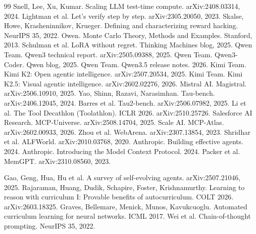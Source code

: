 \documentclass[11pt,a4paper]{article}
\begin{document}
\begin{thebibliography}{99}
 Snell, Lee, Xu, Kumar. Scaling LLM test-time compute. arXiv:2408.03314, 2024.
 Lightman et al. Let's verify step by step. arXiv:2305.20050, 2023.
 Skalse, Howe, Krasheninnikov, Krueger. Defining and characterizing reward hacking. NeurIPS 35, 2022.
 Owen. Monte Carlo Theory, Methods and Examples. Stanford, 2013.
 Schulman et al. LoRA without regret. Thinking Machines blog, 2025.
 Qwen Team. Qwen3 technical report. arXiv:2505.09388, 2025.
 Qwen Team. Qwen3-Coder. Qwen blog, 2025.
 Qwen Team. Qwen3.5 release notes. 2026. %
 Kimi Team. Kimi K2: Open agentic intelligence. arXiv:2507.20534, 2025.
 Kimi Team. Kimi K2.5: Visual agentic intelligence. arXiv:2602.02276, 2026.
 Mistral AI. Magistral. arXiv:2506.10910, 2025.
 Yao, Shinn, Razavi, Narasimhan. Tau-bench. arXiv:2406.12045, 2024.
 Barres et al. Tau2-bench. arXiv:2506.07982, 2025.
 Li et al. The Tool Decathlon (Toolathlon). ICLR 2026. arXiv:2510.25726.
 Salesforce AI Research. MCP-Universe. arXiv:2508.14704, 2025.
 Scale AI. MCP-Atlas. arXiv:2602.00933, 2026.
 Zhou et al. WebArena. arXiv:2307.13854, 2023.
 Shridhar et al. ALFWorld. arXiv:2010.03768, 2020.
 Anthropic. Building effective agents. 2024.
 Anthropic. Introducing the Model Context Protocol. 2024.
 Packer et al. MemGPT. arXiv:2310.08560, 2023.

 Gao, Geng, Hua, Hu et al. A survey of self-evolving agents. arXiv:2507.21046, 2025.
 Rajaraman, Huang, Dudik, Schapire, Foster, Krishnamurthy. Learning to reason with curriculum I: Provable benefits of autocurriculum. COLT 2026. arXiv:2603.18325.
 Graves, Bellemare, Menick, Munos, Kavukcuoglu. Automated curriculum learning for neural networks. ICML 2017.
 Wei et al. Chain-of-thought prompting. NeurIPS 35, 2022.


\end{thebibliography}
\end{document}
